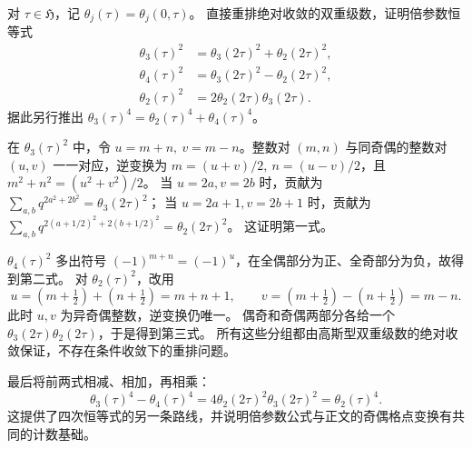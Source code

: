 \begin{exercise}\label{b3:ex:24-6}
对 \(\tau\in\mathfrak H\)，记 \(\theta_j(\tau)=\theta_j(0,\tau)\)。
直接重排绝对收敛的双重级数，证明倍参数恒等式
\[
\begin{aligned}
\theta_3(\tau)^2&=\theta_3(2\tau)^2+\theta_2(2\tau)^2,\\
\theta_4(\tau)^2&=\theta_3(2\tau)^2-\theta_2(2\tau)^2,\\
\theta_2(\tau)^2&=2\theta_2(2\tau)\theta_3(2\tau).
\end{aligned}
\]
据此另行推出 \(\theta_3(\tau)^4=\theta_2(\tau)^4+\theta_4(\tau)^4\)。
\end{exercise}
\begin{solution}
在 \(\theta_3(\tau)^2\) 中，令
\(u=m+n,\ v=m-n\)。整数对 \((m,n)\) 与同奇偶的整数对 \((u,v)\) 一一对应，逆变换为
\(m=(u+v)/2,\ n=(u-v)/2\)，且
\(m^2+n^2=(u^2+v^2)/2\)。
当 \(u=2a,v=2b\) 时，贡献为
\(\sum_{a,b}q^{2a^2+2b^2}=\theta_3(2\tau)^2\)；
当 \(u=2a+1,v=2b+1\) 时，贡献为
\(\sum_{a,b}q^{2(a+1/2)^2+2(b+1/2)^2}=\theta_2(2\tau)^2\)。
这证明第一式。

\(\theta_4(\tau)^2\) 多出符号
\((-1)^{m+n}=(-1)^u\)，在全偶部分为正、全奇部分为负，故得到第二式。
对 \(\theta_2(\tau)^2\)，改用
\[
u=(m+\tfrac12)+(n+\tfrac12)=m+n+1,\qquad
v=(m+\tfrac12)-(n+\tfrac12)=m-n.
\]
此时 \(u,v\) 为异奇偶整数，逆变换仍唯一。
偶奇和奇偶两部分各给一个
\(\theta_3(2\tau)\theta_2(2\tau)\)，于是得到第三式。
所有这些分组都由高斯型双重级数的绝对收敛保证，不存在条件收敛下的重排问题。

最后将前两式相减、相加，再相乘：
\[
\theta_3(\tau)^4-\theta_4(\tau)^4
=4\theta_2(2\tau)^2\theta_3(2\tau)^2
=\theta_2(\tau)^4.
\]
这提供了四次恒等式的另一条路线，并说明倍参数公式与正文的奇偶格点变换有共同的计数基础。
\end{solution}

